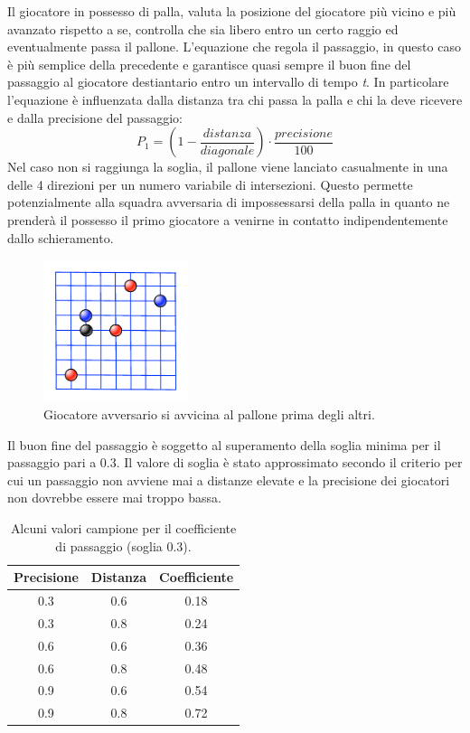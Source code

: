 \documentclass[aps,letterpaper,10pt]{article}
\begin{document}
Il giocatore in possesso di palla, valuta la posizione del giocatore pi\`u vicino e pi\`u avanzato rispetto a se,
controlla che sia libero entro un certo raggio ed eventualmente passa il pallone. L'equazione che regola il passaggio,
in questo caso \`e pi\`u semplice della precedente e garantisce quasi sempre il buon fine del passaggio al giocatore
destiantario entro un intervallo di tempo \emph{t}. In particolare l'equazione \`e influenzata dalla distanza tra chi
passa la palla e chi la deve ricevere e dalla precisione del passaggio: $$ P_1 = \left( 1 - \frac{distanza}{diagonale}
\right) \cdot \frac{precisione}{100} $$ Nel caso non si raggiunga la soglia, il pallone viene lanciato casualmente in
una delle 4 direzioni per un numero variabile di intersezioni. Questo permette potenzialmente alla squadra avversaria di
impossessarsi della palla in quanto ne prender\`a il possesso il primo giocatore a venirne in contatto indipendentemente
dallo schieramento.

\begin{figure}[H]
	\begin{center}
		\includegraphics[width=160px]{images/vision3.pdf}
	\end{center}
\caption{Giocatore avversario si avvicina al pallone prima degli altri.}
\end{figure}

Il buon fine del passaggio \`e soggetto al superamento della soglia minima per il passaggio pari a 0.3. Il valore di
soglia \`e stato approssimato secondo il criterio per cui un passaggio non avviene mai a distanze elevate e la
precisione dei giocatori non dovrebbe essere mai troppo bassa.

\begin{table}[H]
\begin{center}
	\begin{tabular}{|c|c||c|}
		\hline
		\textbf{Precisione} & \textbf{Distanza} & \textbf{Coefficiente} \\ \hline \hline
			0.3 & 0.6 & 0.18 \\ \hline
			0.3 & 0.8 & 0.24 \\ \hline
			0.6 & 0.6 & 0.36 \\ \hline
			0.6 & 0.8 & 0.48 \\ \hline
			0.9 & 0.6 & 0.54 \\ \hline
			0.9 & 0.8 & 0.72 \\ \hline
	\end{tabular}
\end{center}
\caption{Alcuni valori campione per il coefficiente di passaggio (soglia 0.3).}
\end{table}
\end{document}
